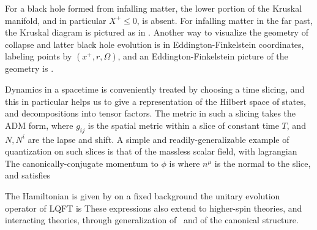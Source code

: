 

For a black hole formed from infalling matter, the lower portion of the Kruskal manifold, and  in particular $X^+\leq0$, is absent.  For infalling matter in the far past, the Kruskal diagram is pictured as in \Kdiag.  Another way to visualize the geometry of collapse and latter black hole evolution is in Eddington-Finkelstein coordinates, labeling points by $(x^+, r, \Omega)$, and an Eddington-Finkelstein picture of the geometry is \EddFink.  



Dynamics in a spacetime is conveniently treated by choosing a time slicing, and this in particular helps us to give a representation of the Hilbert space of states, and decompositions into tensor factors.   The metric in such a slicing takes the ADM form,
%
\eqn{}
%
where $g_{ij}$ is the spatial metric within a slice of constant time $T$, and $N,N^i$ are the lapse and shift.  A simple and readily-generalizable example of quantization on such slices is that of the massless scalar field, with lagrangian
%
\eqn{}
%
The canonically-conjugate momentum to $\phi$ is 
%
\eqn{}
%
where $n^\mu$ is the normal to the slice,
and satisfies
%
\eqn{}
%


The Hamiltonian is given by
%
\eqn{}
%
on a fixed background the unitary evolution operator of LQFT is
%
\eqn{}
%
These expressions also extend to higher-spin theories, and interacting theories, through generalization of \hgen\ and of  the canonical structure.

